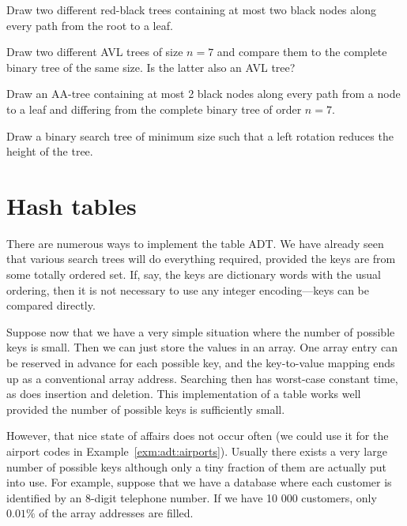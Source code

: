 \begin{Exercise}\label{exr:redblack:example}
Draw two different red-black trees containing at most two black nodes 
along every path from the root to a leaf.
\end{Exercise}


\begin{Exercise}\label{exr:avl:example}
Draw two different AVL trees of size $n=7$ and compare
them to the complete binary tree of the same size. Is
the latter also an AVL tree?
\end{Exercise}



\begin{Exercise}\label{exr:aa:example}
Draw an AA-tree containing at most 2 black nodes 
along every path from a node to a leaf and differing from
the complete binary tree of order \(n=7\).
\end{Exercise}

\begin{Exercise}\label{exr:rotation}
Draw a binary search tree of minimum size such that a left rotation 
reduces the height of the tree.
\end{Exercise}

\section{Hash tables}\label{sec:hash:tables}

There are numerous ways to implement the table ADT. We have already seen 
that various search trees will do everything required, provided the keys are 
from some totally ordered set. If, say, the keys are dictionary words with the 
usual ordering, then it is not necessary to use any integer encoding---keys can 
be compared directly.

Suppose now that we have a very simple situation where the number of 
possible keys is small. Then  we can just store the values in an array. 
One array entry can be reserved in advance for each possible key, and the 
key-to-value mapping ends up as a conventional array address. Searching then 
has worst-case constant time, as does insertion and deletion. This 
implementation of a table works well provided the number of possible keys is 
sufficiently small.

However, that nice state of affairs does not occur often (we could use it 
for the airport codes in  Example~\ref{exm:adt:airports}). Usually there exists 
a very large number of possible keys although only a tiny fraction of them are
actually put into use. For example, suppose that we have a database where each 
customer is identified by an 8-digit telephone number. If we have 10 000 customers, 
only $0.01\%$ of the array addresses are filled.

